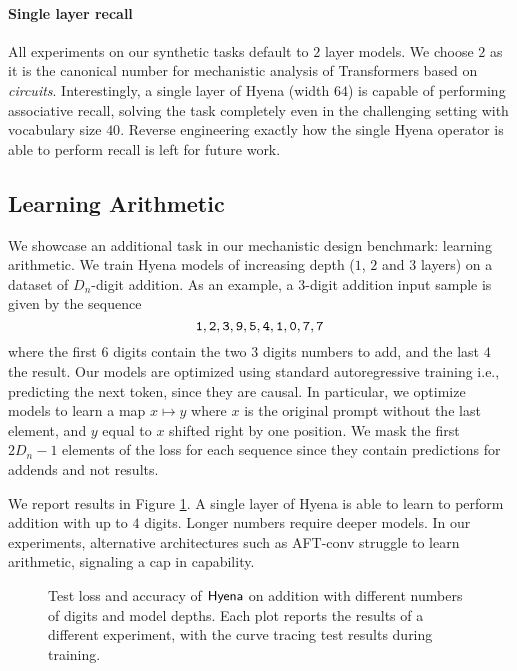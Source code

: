 \paragraph{Single layer recall}
%

All experiments on our synthetic tasks default to $2$ layer models. We choose $2$ as it is the canonical number for mechanistic analysis of Transformers \citep{elhage2021mathematical} based on \textit{circuits}. Interestingly, a single layer of {\sf Hyena} (width $64$) is capable of performing associative recall, solving the task completely even in the challenging setting with vocabulary size $40$. Reverse engineering exactly how the single {\sf Hyena} operator is able to perform recall is left for future work.

\subsection{Learning Arithmetic}
%
We showcase an additional task in our mechanistic design benchmark: learning arithmetic. We train {\sf Hyena} models of increasing depth ($1$, $2$ and $3$ layers) on a dataset of $D_n$-digit addition. As an example, a $3$-digit addition input sample is given by the sequence
\[ 
    {\tt 1, 2, 3, 9, 5, 4, 1, 0, 7, 7}
\]
where the first $6$ digits contain the two $3$ digits numbers to add, and the last $4$ the result. Our models are optimized using standard autoregressive training i.e., predicting the next token, since they are causal. In particular, we optimize models to learn a map $x \mapsto y$ where $x$ is the original prompt without the last element, and $y$ equal to $x$ shifted right by one position. We mask the first $2 D_n - 1$ elements of the loss for each sequence since they contain predictions for addends and not results.

We report results in Figure \ref{fig:arithmetic}. A single layer of {\sf Hyena} is able to learn to perform addition with up to $4$ digits. Longer numbers require deeper models. In our experiments, alternative architectures such as AFT-conv struggle to learn arithmetic, signaling a cap in capability.

%
\begin{figure}
    \centering
    
    \vspace{-2mm}
    \caption{Test loss and accuracy of $\sf Hyena$ on addition with different numbers of digits and model depths. Each plot reports the results of a different experiment, with the curve tracing test results during training.}
    \label{fig:arithmetic}
\end{figure}